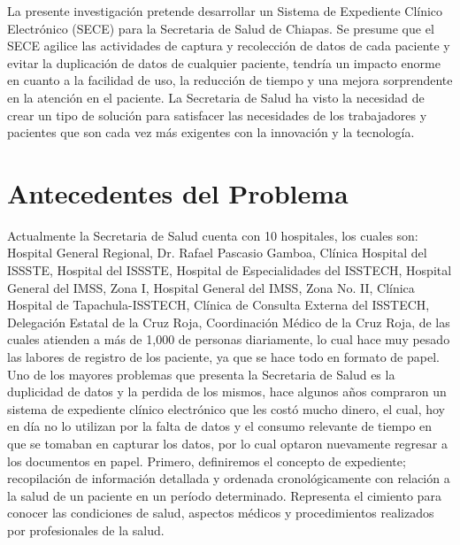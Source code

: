 La presente investigación pretende desarrollar un Sistema de Expediente Clínico Electrónico (SECE) para la Secretaria de Salud de Chiapas. Se presume que el SECE agilice las actividades de captura y recolección de datos de cada paciente y evitar la duplicación de datos de cualquier paciente, tendría un impacto enorme en cuanto a la facilidad de uso, la reducción de tiempo y una mejora sorprendente en la atención en el paciente. La Secretaria de Salud ha visto la necesidad de crear un tipo de solución para satisfacer las necesidades de los trabajadores y pacientes que son cada vez más exigentes con la innovación y la tecnología.

\section{Antecedentes del Problema}
Actualmente la Secretaria de Salud  cuenta con 10 hospitales, los cuales son: Hospital General Regional, Dr. Rafael Pascasio Gamboa, Clínica Hospital del ISSSTE, Hospital del ISSSTE, Hospital de Especialidades del ISSTECH, Hospital General del IMSS, Zona I, Hospital General del IMSS, Zona No. II, Clínica Hospital de Tapachula-ISSTECH, Clínica de Consulta Externa del ISSTECH, Delegación Estatal de la Cruz Roja, Coordinación Médico de la Cruz Roja, de las cuales atienden a más de 1,000 de personas diariamente, lo cual hace muy pesado las labores de registro de los paciente, ya que se hace todo en formato de papel. Uno de los mayores problemas que presenta la Secretaria de Salud es la duplicidad de datos y la perdida de los mismos, hace algunos años compraron un sistema de expediente clínico electrónico que les costó mucho dinero, el cual, hoy en día no lo utilizan por la falta de datos y el consumo relevante de tiempo en que se tomaban en capturar los datos, por lo cual optaron nuevamente regresar a los documentos en papel.
Primero, definiremos el concepto de expediente; recopilación de información detallada y ordenada cronológicamente con relación a la salud de un paciente en un período determinado. Representa el cimiento para conocer las condiciones de salud, aspectos médicos y procedimientos realizados por profesionales de la salud. \cite{Gracia}
